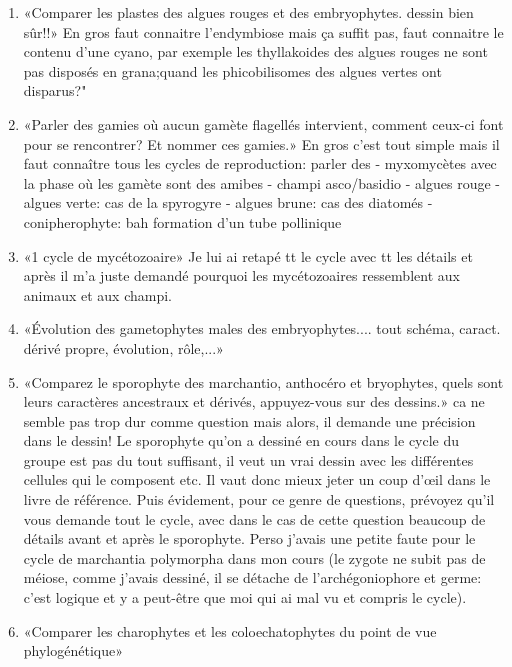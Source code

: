 \begin{enumerate}
	\item «Comparer les plastes des algues rouges et des embryophytes. dessin bien sûr!!»
En gros faut connaitre l’endymbiose mais ça suffit pas, faut connaitre le contenu d’une
cyano, par exemple les thyllakoides des algues rouges ne sont pas disposés en grana;quand les phicobilisomes des algues vertes ont disparus?"

	\item «Parler des gamies où aucun gamète flagellés intervient, comment ceux-ci font pour se rencontrer? Et nommer ces gamies.» En gros c'est tout simple mais il faut connaître tous les cycles de reproduction: parler des
- myxomycètes avec la phase où les gamète sont des amibes
- champi asco/basidio
- algues rouge
- algues verte: cas de la spyrogyre
- algues brune: cas des diatomés
- conipherophyte: bah formation d’un tube pollinique

	\item «1 cycle de mycétozoaire»
 Je lui ai retapé tt le cycle avec tt les détails et après il m'a juste demandé pourquoi les mycétozoaires ressemblent aux animaux et aux champi.

	\item «Évolution des gametophytes males des embryophytes.... tout schéma, caract. dérivé propre, évolution, rôle,...»

	\item «Comparez le sporophyte des marchantio, anthocéro et bryophytes, quels sont leurs caractères ancestraux et dérivés, appuyez-vous sur des dessins.»
ca ne semble pas trop dur comme question mais alors, il demande une précision dans le dessin! Le sporophyte qu’on a dessiné en cours dans le cycle du groupe est pas du tout suffisant, il veut un vrai dessin avec les différentes cellules qui le composent etc. Il vaut donc mieux jeter un coup d'œil dans le livre de référence. Puis évidement, pour ce genre de questions, prévoyez qu'il vous demande tout le cycle, avec dans le cas de cette question beaucoup de détails avant et après le sporophyte. Perso j'avais une petite faute pour le cycle de marchantia polymorpha dans mon cours (le zygote ne subit pas de méiose, comme j'avais dessiné, il se détache de l'archégoniophore et germe: c'est logique et y a peut-être que moi qui ai mal vu et compris le cycle).

	\item «Comparer les charophytes et les coloechatophytes du point de vue phylogénétique»
\end{enumerate}